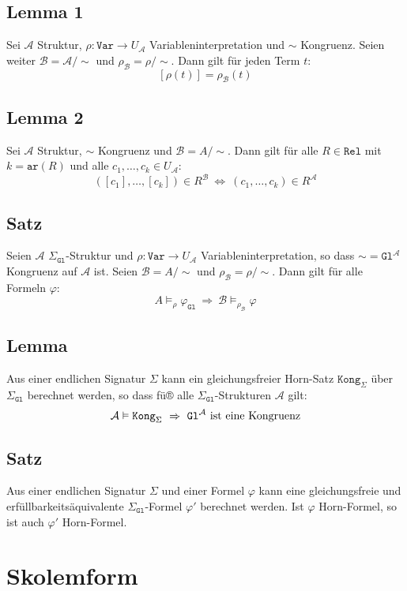 \documentclass[12pt,a4paper]{report}
\newcommand{\ra}{\rightarrow}
\newcommand{\RA}{\Rightarrow}
\newcommand{\ls}{\newline\newline}
\newcommand{\green}[1]{\textcolor[rgb]{0.1,0.6,0.1}{#1}}
\newcommand{\blue}[1]{\textcolor[rgb]{0.2,0.2,1}{#1}}
\begin{document}
\subsection{\green{Lemma 1}}
Sei $ \mathcal{A} $ Struktur, $ \rho: \texttt{Var} \ra U_\mathcal{A} $ Variableninterpretation und $ \sim $ Kongruenz. Seien weiter $ \mathcal{B} = \mathcal{A}/\sim $ und $ \rho_\mathcal{B} = \rho/\sim $. Dann gilt für jeden Term $ t $:
\[
    [\rho(t)] = \rho_\mathcal{B}(t)
\]
\subsection{\green{Lemma 2}}
Sei $ \mathcal{A} $ Struktur, $ \sim $ Kongruenz und $ \mathcal{B} = A/\sim $. Dann gilt für alle $ R \in \texttt{Rel} $ mit $ k = \texttt{ar}(R) $ und alle $ c_1,\dots,c_k \in U_\mathcal{A} $:
\[
    ([c_1], \dots, [c_k]) \in R^\mathcal{B} ~\Leftrightarrow~ (c_1,\dots,c_k) \in R^\mathcal{A}
\]
\subsection{\green{Satz}}
Seien $ \mathcal{A} $ $ \Sigma_\texttt{Gl} $-Struktur und $ \rho: \texttt{Var} \ra U_\mathcal{A} $ Variableninterpretation, so dass $ \sim = \texttt{Gl}^\mathcal{A} $ Kongruenz auf $ \mathcal{A}  $ ist.\ls
Seien $ \mathcal{B} = A/\sim $ und $ \rho_\mathcal{B} = \rho/\sim $. Dann gilt für alle Formeln $ \varphi $:
\[
    A \vDash_\rho \varphi_\texttt{Gl} ~\RA~ \mathcal{B} \vDash_{\rho_\mathcal{B}} \varphi
\]
\subsection{\green{Lemma}}
Aus einer endlichen Signatur $ \Sigma $ kann ein gleichungsfreier Horn-Satz $ \texttt{Kong}_\Sigma $ über $ \Sigma_\texttt{Gl} $ berechnet werden, so dass fü® alle $ \Sigma_\texttt{Gl} $-Strukturen $ \mathcal{A} $ gilt:
\[
    \mathcal{A} \vDash \texttt{Kong}_\Sigma ~\RA~ \texttt{Gl}^\mathcal{A} \textnormal{ ist eine Kongruenz}
\]
\subsection{\green{Satz}}
Aus einer endlichen Signatur $ \Sigma $ und einer Formel $ \varphi $ kann eine gleichungsfreie und erfüllbarkeitsäquivalente $ \Sigma_\texttt{Gl} $-Formel $ \varphi' $ berechnet werden.\ls
Ist $ \varphi $ Horn-Formel, so ist auch $ \varphi' $ Horn-Formel.

\section{\blue{Skolemform}}
\end{document}
